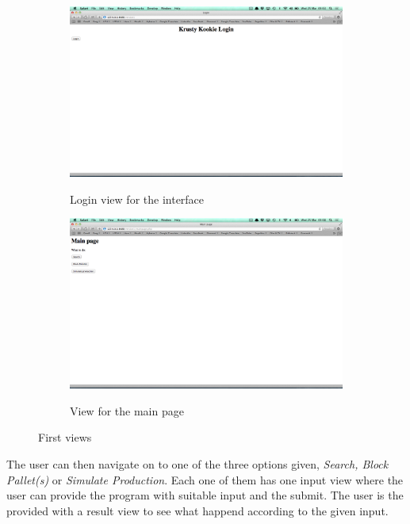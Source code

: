\documentclass[a4paper]{scrartcl}
\numberwithin{equation}{section}
\begin{document}
\begin{figure}[h]
  \centering
  	\begin{subfigure}[b]{0.45\textwidth}
    	\includegraphics[width=\textwidth]{figures/view_login.png}
    	\label{figure:view_login}
    	\caption{Login view for the interface}
 		\end{subfigure}	
 		\begin{subfigure}[b]{0.45\textwidth}
    	\includegraphics[width=\textwidth]{figures/view_mainpage.png}
    	\label{figure:view_mainpage}
    	\caption{View for the main page}
 		\end{subfigure} 
 		\caption{First views}
\end{figure}

The user can then navigate on to one of the three options given, \emph{Search, Block Pallet(s)} or \emph{Simulate Production}. Each one of them has one input view where the user can provide the program with suitable input and the submit. The user is the provided with a result view to see what happend according to the given input.
\end{document}
